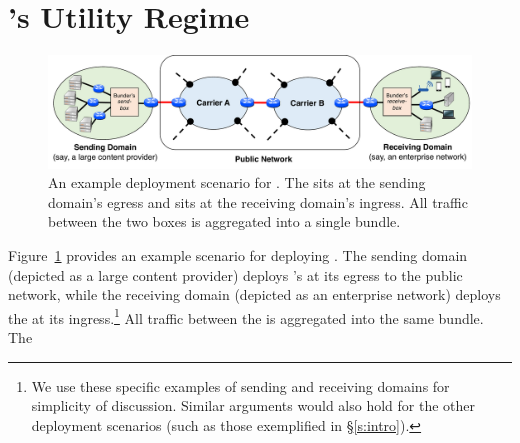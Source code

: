 \section{\name's Utility Regime}
\label{s:deploy}

\begin{figure}
    \centering
    \includegraphics[width=\textwidth]{img/deployment-arch.pdf}
    \caption{An example deployment scenario for \name. 
    The \inbox sits at the sending domain's egress and \outbox sits at the receiving domain's ingress. All traffic between the two boxes is aggregated into a single bundle. 
    }\label{fig:deploy:arch}
\end{figure}


Figure~\ref{fig:deploy:arch}  provides an example scenario for deploying \name. The sending domain (depicted as a large content provider) deploys \name's \inbox at its egress to the public network, while the receiving domain (depicted as an enterprise network) deploys the \outbox at its ingress.\footnote{We use these specific examples of sending and receiving domains for simplicity of discussion. Similar arguments would also hold for the other deployment scenarios (such as those exemplified in \S\ref{s:intro}).} All traffic between the \pair is aggregated into the same bundle. The \inbox {} 

